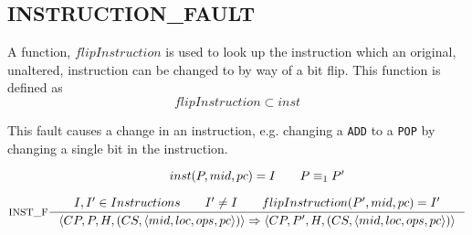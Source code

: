 \subsection{INSTRUCTION\_FAULT}
A function, $flipInstruction$ is used to look up the instruction which an original, unaltered, instruction can be changed to by way of a bit flip. This function is defined as
$$flipInstruction \subset inst$$



This fault causes a change in an instruction, e.g. changing a \texttt{ADD} to a \texttt{POP} by changing a single bit in the instruction.

$$\inference[INST\_F]{
inst(P,mid, pc) = I \semsp
P \equiv_1 P' \semnl \\
I,I' \in Instructions \semsp
I' \neq I \semsp
flipInstruction(P',mid, pc) = I'
}
{\langle CP, P, H, (CS, \langle mid, loc, ops, pc \rangle) \rangle \Rightarrow \langle CP, P', H, (CS, \langle mid, loc, ops, pc \rangle)\rangle }$$
